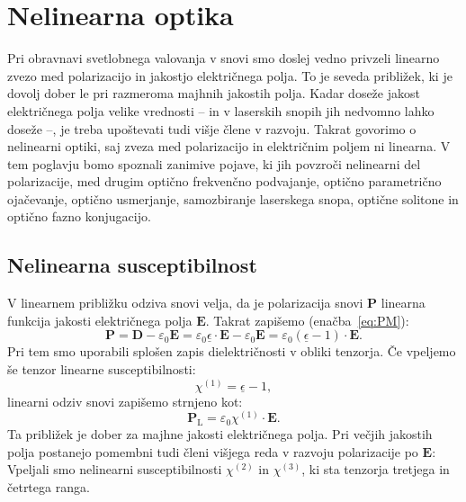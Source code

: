 
\chapter{Nelinearna optika}
\label{chap:NLO}
Pri obravnavi svetlobnega valovanja v snovi smo doslej vedno privzeli linearno 
zvezo med polarizacijo in jakostjo električnega polja. To 
je seveda približek, ki je dovolj dober le pri razmeroma majhnih jakostih
polja. Kadar doseže jakost električnega polja velike vrednosti -- in v laserskih snopih
jih nedvomno lahko doseže --, je treba upoštevati tudi višje člene v razvoju. Takrat
govorimo o nelinearni optiki, saj zveza med polarizacijo
in električnim poljem ni linearna. V tem poglavju bomo spoznali zanimive pojave, ki jih 
povzroči nelinearni del polarizacije, med drugim optično 
frekvenčno podvajanje, optično parametrično ojačevanje, optično usmerjanje, 
samozbiranje laserskega snopa, optične solitone in optično fazno konjugacijo. 

\section{Nelinearna susceptibilnost}
\label{Chap:Chi}
V linearnem približku odziva snovi velja, da je polarizacija snovi 
$\mathbf{P}$ linearna funkcija jakosti električnega polja 
$\mathbf{E}$. Takrat zapišemo (enačba~\ref{eq:PM}):
\begin{equation}
\mathbf{P} = \mathbf{D} - \varepsilon_0 \mathbf{E} = 
\varepsilon_0 \underline{\epsilon} \cdot\mathbf{E} - \varepsilon_0 \mathbf{E} = 
\varepsilon_0 (\underline{\epsilon} - 1)\cdot\mathbf{E}. 
\end{equation}
Pri tem smo uporabili splošen zapis dielektričnosti v obliki tenzorja. Če vpeljemo še tenzor linearne susceptibilnosti:
\begin{equation}
\chi^{(1)} = \underline{\epsilon} - 1,
\end{equation}
linearni odziv snovi zapišemo strnjeno kot:
\begin{equation}
\mathbf{P}_{\mathrm{L}} =  \varepsilon_0 \chi^{(1)} \cdot \mathbf{E}.
\end{equation}
Ta približek je dober za majhne jakosti električnega polja. Pri večjih jakostih polja
postanejo pomembni tudi členi višjega reda v razvoju polarizacije
po $\mathbf{E}$:
Vpeljali smo nelinearni susceptibilnosti 
$\chi^{(2)}$ in $\chi^{(3)}$, ki sta tenzorja tretjega in četrtega ranga.

